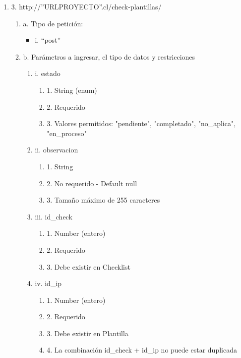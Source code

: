 \begin{enumerate}
    \item 3. http://”URLPROYECTO”.cl/check-plantillas/
    \begin{enumerate}
        \item a. Tipo de petición:
            \begin{itemize}
               \item i. “post”
            \end{itemize}
        \item b. Parámetros a ingresar, el tipo de datos y restricciones
            \begin{enumerate}
                \item i. estado
                    \begin{enumerate}
                        \item 1. String (enum)
                        \item 2. Requerido
                        \item 3. Valores permitidos: "pendiente", "completado", "no\_aplica", "en\_proceso"
                    \end{enumerate}
                \item ii. observacion
                    \begin{enumerate}
                        \item 1. String
                        \item 2. No requerido - Default null
                        \item 3. Tamaño máximo de 255 caracteres
                    \end{enumerate}
                \item iii. id\_check
                    \begin{enumerate}
                        \item 1. Number (entero)
                        \item 2. Requerido
                        \item 3. Debe existir en Checklist
                    \end{enumerate}
                \item iv. id\_ip
                    \begin{enumerate}
                        \item 1. Number (entero)
                        \item 2. Requerido
                        \item 3. Debe existir en Plantilla
                        \item 4. La combinación id\_check + id\_ip no puede estar duplicada
                    \end{enumerate}
            \end{enumerate}
    \end{enumerate}


\end{enumerate}
